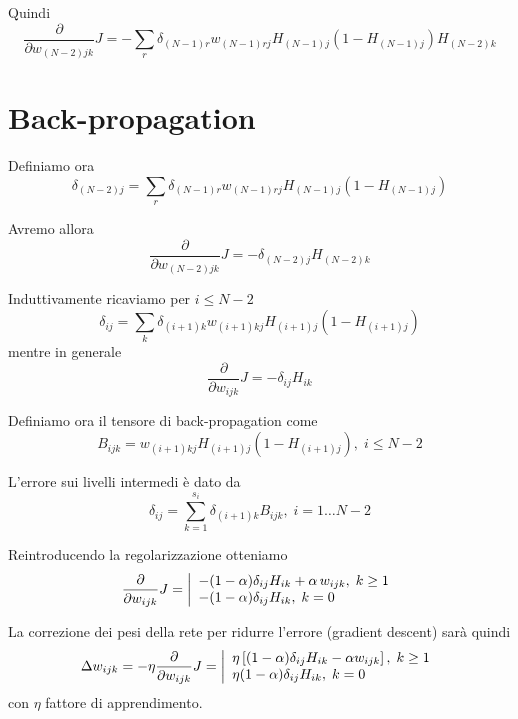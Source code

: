 \documentclass[a4paper,11pt]{article}
\begin{document}
Quindi
\[
	\frac{\partial}{\partial w_{(N-2)jk}} J =
	- \sum_r \delta_{(N-1)r} w_{(N-1)rj}
	H_{(N-1)j} (1 - H_{(N-1)j}) H_{(N-2)k}
\]

\section{Back-propagation}

Definiamo ora
\[
	\delta_{(N-2)j} =
	\sum_r \delta_{(N-1)r} w_{(N-1)rj} H_{(N-1)j} (1 - H_{(N-1)j})
\]

Avremo allora
\[
	\frac{\partial}{\partial w_{(N-2)jk}} J =
	- \delta_{(N-2)j}  H_{(N-2)k}
\]

Induttivamente ricaviamo per $ i \le N - 2 $ 
\[
	\delta_{ij} =
	\sum_k \delta_{(i+1)k} w_{(i+1)kj} H_{(i+1)j} (1 - H_{(i+1)j})
\]
mentre in generale
\[
	\frac{\partial}{\partial w_{ijk}} J =
	- \delta_{ij} H_{ik}
\]

Definiamo ora il tensore di back-propagation come 
\[
  B_{ijk} =  w_{(i+1)kj} H_{(i+1)j} (1 - H_{(i+1)j}), \; i \le N-2
\]

L'errore sui livelli intermedi è dato da
\[
  \delta_{ij} = \sum_{k=1}^{s_i} \delta_{(i+1)k} B_{ijk},\; i = 1 \dots N-2
\]

Reintroducendo la regolarizzazione otteniamo
\[
	\frac{\partial}{\partial w_{ijk}} J =\left|
    \begin{array}l
		-(1 - \alpha) \delta_{ij} H_{ik} + \alpha \, w_{ijk}, \; k \ge 1
	      \\
		-(1 - \alpha) \delta_{ij} H_{ik}, \; k =0
    \end{array}
  \right.
\]

La correzione dei pesi della rete per ridurre l'errore (gradient descent) sarà quindi
\[
  \Delta w_{ijk}  = -\eta \frac{\partial}{\partial w_{ijk}} J = \left|
  \begin{array}l
    \eta \left[ (1 - \alpha) \delta_{ij} H_{ik} - \alpha w_{ijk} \right], \; k \ge 1
    \\
    \eta (1 - \alpha) \delta_{ij} H_{ik}, \; k = 0
  \end{array}
  \right.
\]
con $ \eta $ fattore di apprendimento.
\end{document}
